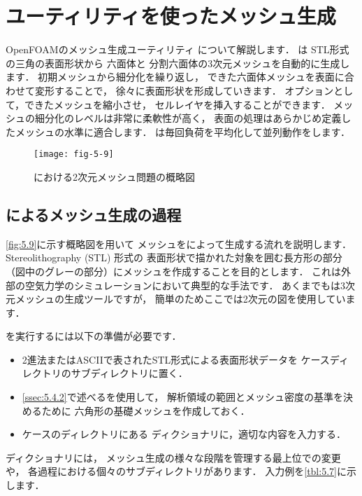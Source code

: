 \section{ユーティリティを使ったメッシュ生成}
\label{sec:5.4}
%
%
%
OpenFOAMのメッシュ生成ユーティリティ
について解説します．
は
%
STL形式の三角の表面形状から
六面体と
%
分割六面体の3次元メッシュを自動的に生成します．
初期メッシュから細分化を繰り返し，
できた六面体メッシュを表面に合わせて変形することで，
徐々に表面形状を形成していきます．
オプションとして，できたメッシュを縮小させ，
セルレイヤを挿入することができます．
メッシュの細分化のレベルは非常に柔軟性が高く，
表面の処理はあらかじめ定義したメッシュの水準に適合します．
は毎回負荷を平均化して並列動作をします．


\begin{figure}[ht]
 \texttt{[image: fig-5-9]}
 \caption{における2次元メッシュ問題の概略図}
 \label{fig:5.9}
\end{figure}


\subsection{によるメッシュ生成の過程}
\label{ssec:5.4.1}
\autoref{fig:5.9}に示す概略図を用いて
メッシュをによって生成する流れを説明します．
%
Stereolithography (STL) 形式の
%
表面形状で描かれた対象を囲む長方形の部分
（図中のグレーの部分）にメッシュを作成することを目的とします．
これは外部の空気力学のシミュレーションにおいて典型的な手法です．
あくまでもは3次元メッシュの生成ツールですが，
簡単のためここでは2次元の図を使用しています．

を実行するには以下の準備が必要です．
\begin{itemize}
 \item 2進法またはASCIIで表されたSTL形式による表面形状データを
       ケースディレクトリのサブディレクトリに置く．
 \item \autoref{ssec:5.4.2}で述べるを使用して，
       解析領域の範囲とメッシュ密度の基準を決めるために
       六角形の基礎メッシュを作成しておく．
 \item ケースのディレクトリにある
%
%
       ディクショナリに，適切な内容を入力する．
\end{itemize}
ディクショナリには，
%
メッシュ生成の様々な段階を管理する最上位での変更や，
各過程における個々のサブディレクトリがあります．
入力例を\autoref{tbl:5.7}に示します．


